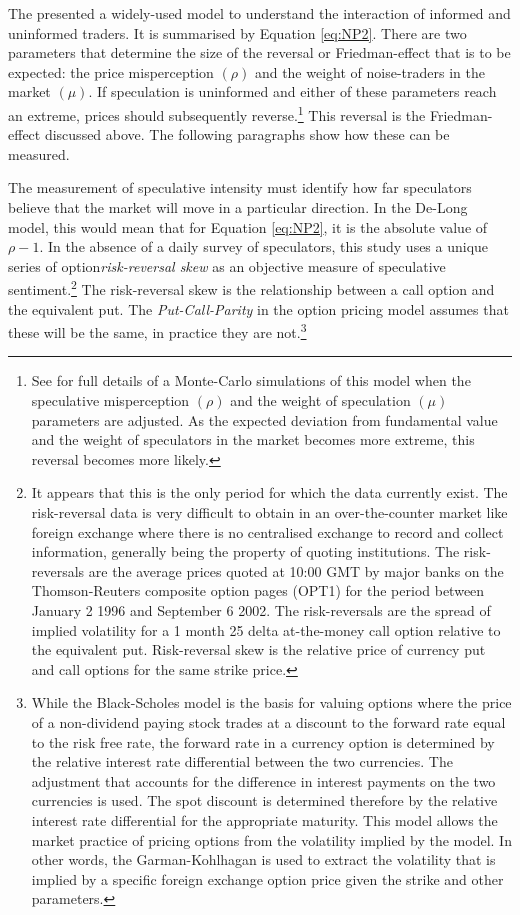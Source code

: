 \documentclass[preprint,12pt,authoryear]{elsarticle}
\begin{document}
The \citet[pp. 14-15]{Delong1990noise} presented a widely-used model to understand the interaction of informed and uninformed traders.  It is summarised by Equation \ref{eq:NP2}. There are two parameters that determine the size of the reversal or Friedman-effect that is to be expected:  the price misperception $(\rho)$ and the weight of noise-traders in the market $(\mu)$.  If speculation is uninformed and either of these parameters reach an extreme, prices should subsequently reverse.\footnote{See \citet{Hayward2013} for full details of a Monte-Carlo simulations of this model when the speculative misperception $(\rho)$ and the weight of speculation $(\mu)$ parameters are adjusted. As the expected deviation from fundamental value and the weight of speculators in the market becomes more extreme, this reversal becomes more likely.}  This reversal is the Friedman-effect discussed above. The following paragraphs show how these can be measured. 

The measurement of speculative intensity must identify how far speculators believe that the market will move in a particular direction. In the De-Long model, this would mean that for Equation \ref{eq:NP2}, it is the absolute value of $\rho - 1$.  In the absence of a daily survey of speculators, this study uses a unique series of option\emph{risk-reversal skew} as an objective measure of speculative sentiment.\footnote{It appears that this is the only period for which the data currently exist.  The risk-reversal data is very difficult to obtain in an over-the-counter market like foreign exchange where there is no centralised exchange to record and collect information, generally being the property of quoting institutions.  The risk-reversals are the average prices quoted at 10:00 GMT by major banks on the Thomson-Reuters composite option pages (OPT1)  for the period between January 2 1996 and September 6 2002.  The risk-reversals are the spread of implied volatility for a 1 month 25 delta at-the-money call option relative to the equivalent put.  Risk-reversal skew is the relative price of currency put and call options for the same strike price.} The risk-reversal skew is the relationship between a call option and the equivalent put. The \emph{Put-Call-Parity} in the  \citet{Black1973Options} option pricing model assumes that these will be the same, in practice they are not.\footnote{While the Black-Scholes model is the basis for valuing options where the price of a non-dividend paying stock trades at a discount to the forward rate equal to the risk free rate, the forward rate in a currency option is determined by the relative interest rate differential between the two currencies.   The \citet{GarmanKohlhagan} adjustment that accounts for the difference in interest payments on the two currencies is used.   The spot discount is determined therefore by the relative interest rate differential for the appropriate maturity.   This model allows the market practice of pricing options from the volatility implied by the model.  In other words, the Garman-Kohlhagan is used to extract the volatility that is implied by a specific foreign exchange option price given the strike and other parameters.}    
\end{document}
